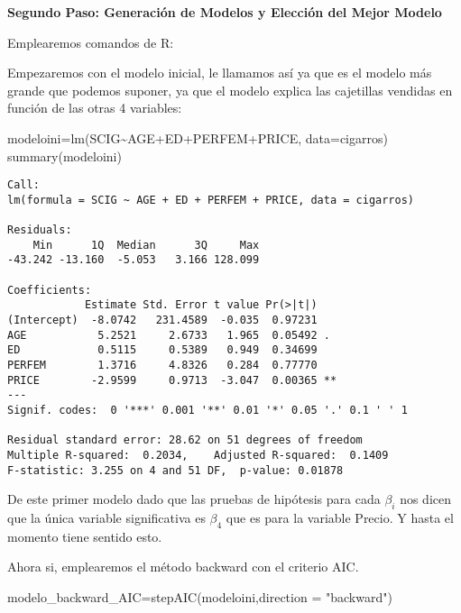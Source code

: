 \documentclass[
  a4paper,
  oneside,
  openany]{book}
\newenvironment{Shaded}{\begin{snugshade}}{\end{snugshade}}
\newcommand{\AttributeTok}[1]{\textcolor[rgb]{0.77,0.63,0.00}{#1}}
\newcommand{\FunctionTok}[1]{\textcolor[rgb]{0.00,0.00,0.00}{#1}}
\newcommand{\NormalTok}[1]{#1}
\newcommand{\OtherTok}[1]{\textcolor[rgb]{0.56,0.35,0.01}{#1}}
\newcommand{\SpecialCharTok}[1]{\textcolor[rgb]{0.00,0.00,0.00}{#1}}
\newcommand{\StringTok}[1]{\textcolor[rgb]{0.31,0.60,0.02}{#1}}
\begin{document}
\textbf{Segundo Paso: Generación de Modelos y Elección del Mejor Modelo}

Emplearemos comandos de R:

Empezaremos con el modelo inicial, le llamamos así ya que es el modelo más grande que podemos suponer, ya que el modelo explica las cajetillas vendidas en función de las otras 4 variables:

\begin{Shaded}
\begin{Highlighting}[]
\NormalTok{modeloini}\OtherTok{=}\FunctionTok{lm}\NormalTok{(SCIG}\SpecialCharTok{\textasciitilde{}}\NormalTok{AGE}\SpecialCharTok{+}\NormalTok{ED}\SpecialCharTok{+}\NormalTok{PERFEM}\SpecialCharTok{+}\NormalTok{PRICE, }\AttributeTok{data=}\NormalTok{cigarros) }
\FunctionTok{summary}\NormalTok{(modeloini)}
\end{Highlighting}
\end{Shaded}

\begin{verbatim}
Call:
lm(formula = SCIG ~ AGE + ED + PERFEM + PRICE, data = cigarros)

Residuals:
    Min      1Q  Median      3Q     Max 
-43.242 -13.160  -5.053   3.166 128.099 

Coefficients:
            Estimate Std. Error t value Pr(>|t|)   
(Intercept)  -8.0742   231.4589  -0.035  0.97231   
AGE           5.2521     2.6733   1.965  0.05492 . 
ED            0.5115     0.5389   0.949  0.34699   
PERFEM        1.3716     4.8326   0.284  0.77770   
PRICE        -2.9599     0.9713  -3.047  0.00365 **
---
Signif. codes:  0 '***' 0.001 '**' 0.01 '*' 0.05 '.' 0.1 ' ' 1

Residual standard error: 28.62 on 51 degrees of freedom
Multiple R-squared:  0.2034,    Adjusted R-squared:  0.1409 
F-statistic: 3.255 on 4 and 51 DF,  p-value: 0.01878
\end{verbatim}

De este primer modelo dado que las pruebas de hipótesis para cada \(\beta_{i}\) nos dicen que la única variable significativa es \(\beta_{4}\) que es para la variable Precio. Y hasta el momento tiene sentido esto.

Ahora si, emplearemos el método backward con el criterio AIC.

\begin{Shaded}
\begin{Highlighting}[]
\NormalTok{modelo\_backward\_AIC}\OtherTok{=}\FunctionTok{stepAIC}\NormalTok{(modeloini,}\AttributeTok{direction =} \StringTok{"backward"}\NormalTok{)}
\end{Highlighting}
\end{Shaded}
\end{document}

